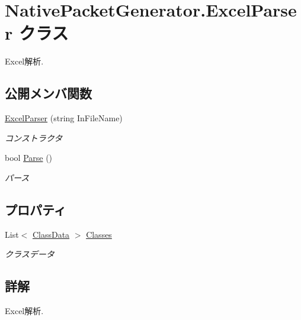 \hypertarget{classNativePacketGenerator_1_1ExcelParser}{}\section{Native\+Packet\+Generator.\+Excel\+Parser クラス}
\label{classNativePacketGenerator_1_1ExcelParser}


Excel解析.  


\subsection*{公開メンバ関数}
\begin{DoxyCompactItemize}
\item 
\mbox{\hyperlink{classNativePacketGenerator_1_1ExcelParser_a2bfc8aeba38fdc6d17dd6a6205ced964}{Excel\+Parser}} (string In\+File\+Name)
\begin{DoxyCompactList}\small\item\em コンストラクタ \end{DoxyCompactList}\item 
bool \mbox{\hyperlink{classNativePacketGenerator_1_1ExcelParser_a7c66d21c3c796ec1051f5b28cef69ed0}{Parse}} ()
\begin{DoxyCompactList}\small\item\em パース \end{DoxyCompactList}\end{DoxyCompactItemize}
\subsection*{プロパティ}
\begin{DoxyCompactItemize}
\item 
List$<$ \mbox{\hyperlink{classNativePacketGenerator_1_1ClassData}{Class\+Data}} $>$ \mbox{\hyperlink{classNativePacketGenerator_1_1ExcelParser_a23b18866f851a758ddf54ac9f077c3e0}{Classes}}
\begin{DoxyCompactList}\small\item\em クラスデータ \end{DoxyCompactList}\end{DoxyCompactItemize}


\subsection{詳解}
Excel解析. 




